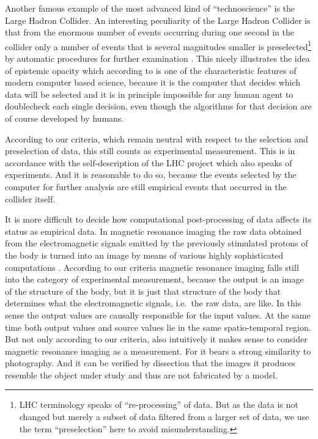 \documentclass[12pt, a4paper]{article}
\numberwithin{equation}{section}
\begin{document}
Another famous example of the most advanced kind of ``technoscience'' is the Large Hadron Collider. An interesting peculiarity of the Large Hadron Collider is that from the enormous number of events occurring during one second in the collider only a number of events that is several magnitudes smaller is preselected\footnote{LHC terminology speaks of ``re-processing'' of data. But as the data is not changed but merely a subset of data filtered from a larger set of data, we use the term ``preselection'' here to avoid misunderstanding.} by automatic procedures for further examination \citep{lhc-wlcg:2011}. This nicely illustrates the idea of epistemic opacity which according to \citet{humphreys:2004} is one of the characteristic features of modern computer based science, because it is the computer that decides which data will be selected and it is in principle impossible for any human agent to doublecheck each single decision, even though the algorithms for that decision are of course developed by humans. 

According to our criteria, which remain neutral with respect to the selection and preselection of data, this still counts as experimental measurement. This is in accordance with the self-description of the LHC project which also speaks of experiments. And it is reasonable to do so, because the events selected by the computer for further analysis are still empirical events that occurred in the collider itself. 

It is more difficult to decide how computational post-processing of data affects its status as empirical data. In magnetic resonance imaging the raw data obtained from the electromagnetic signals emitted by the previously stimulated protons of the body is turned into an image by means of various highly sophisticated computations \citep{lee-carroll:2010}. According to our criteria magnetic resonance imaging falls still into the category of experimental measurement, because the output is an image of the structure of the body, but it is just that structure of the body that determines what the electromagnetic signals, i.e.\ the raw data, are like. In this sense the output values are causally responsible for the input values. At the same time both output values and source values lie in the same spatio-temporal region. But not only according to our criteria, also intuitively it makes sense to consider magnetic resonance imaging as a measurement. For it bears a strong similarity to photography. And it can be verified by dissection that the images it produces resemble the object under study and thus are not fabricated by a model.
\end{document}
